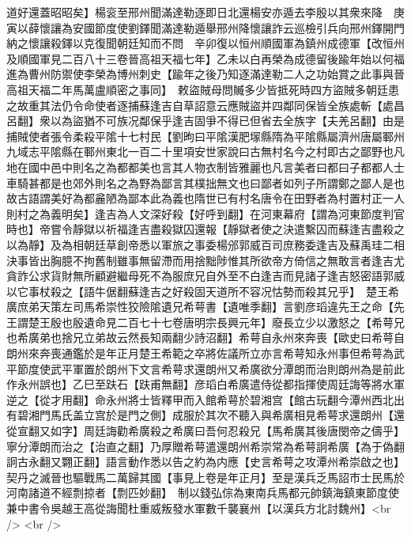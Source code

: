 道好還蓋昭昭矣】楊衮至邢州聞滿達勒逐即日北還楊安亦遁去李殷以其衆來降　庚寅以薛懷讓為安國節度使劉鐸聞滿達勒遁舉邢州降懷讓詐云巡檢引兵向邢州鐸開門納之懷讓殺鐸以克復聞朝廷知而不問　辛卯復以恒州順國軍為鎮州成德軍【改恒州及順國軍見二百八十三卷晉高祖天福七年】乙未以白再榮為成德留後踰年始以何福進為曹州防禦使李榮為博州刺史【踰年之後乃知逐滿達勒二人之功始賞之此事與晉高祖天福二年馬萬盧順密之事同】　敕盜賊母問贓多少皆抵死時四方盜賊多朝廷患之故重其法仍令命使者逐捕蘇逢吉自草詔意云應賊盜并四鄰同保皆全族處斬【處昌呂翻】衆以為盜猶不可族况鄰保乎逢吉固爭不得已但省去全族字【夫羌呂翻】由是捕賊使者張令柔殺平隂十七村民【劉昫曰平隂漢肥塜縣隋為平隂縣屬濟州唐屬鄆州九域志平隂縣在鄆州東北一百二十里項安世家說曰古無村名今之村即古之鄙野也凡地在國中邑中則名之為都都美也言其人物衣制皆雅麗也凡言美者曰都曰子都都人士車騎甚都是也郊外則名之為野為鄙言其樸拙無文也曰鄙者如列子所謂鄭之鄙人是也故古語謂美好為都麄陋為鄙本此為義也隋世已有村名唐令在田野者為村置村正一人則村之為義明矣】逢吉為人文深好殺【好呼到翻】在河東幕府【謂為河東節度判官時也】帝嘗令靜獄以祈福逢吉盡殺獄囚還報【靜獄者使之決遣繫囚而蘇逢吉盡殺之以為靜】及為相朝廷草創帝悉以軍旅之事委楊邠郭威百司庶務委逢吉及蘇禹珪二相決事皆出胸臆不拘舊制雖事無留滯而用捨黜陟惟其所欲帝方倚信之無敢言者逢吉尤貪詐公求貨財無所顧避繼母死不為服庶兄自外至不白逢吉而見諸子逢吉怒密語郭威以它事杖殺之【語牛倨翻蘇逢吉之好殺固天道所不容况怙勢而殺其兄乎】　楚王希廣庶弟天策左司馬希崇性狡險隂遺兄希萼書【遺唯季翻】言劉彦瑫違先王之命【先王謂楚王殷也殷遺命見二百七十七卷唐明宗長興元年】廢長立少以激怒之【希萼兄也希廣弟也捨兄立弟故云然長知兩翻少詩沼翻】希萼自永州來奔喪【歐史曰希萼自朗州來奔喪通鑑於是年正月楚王希範之卒將佐議所立亦言希萼知永州事但希萼為武平節度使武平軍置於朗州下文言希萼求還朗州又希廣欲分潭朗而治則朗州為是前此作永州誤也】乙巳至趺石【趺甫無翻】彦瑫白希廣遣侍從都指揮使周廷誨等將水軍逆之【從才用翻】命永州將士皆釋甲而入館希萼於碧湘宫【館古玩翻今潭州西北出有碧湘門馬氏盖立宫於是門之側】成服於其次不聽入與希廣相見希萼求還朗州【還從宣翻又如字】周廷誨勸希廣殺之希廣曰吾何忍殺兄【馬希廣其後唐閔帝之儔乎】寧分潭朗而治之【治直之翻】乃厚贈希萼遣還朗州希崇常為希萼詗希廣【為于偽翻詗古永翻又翾正翻】語言動作悉以告之約為内應【史言希萼之攻潭州希崇啟之也】　契丹之滅晉也驅戰馬二萬歸其國【事見上卷是年正月】至是漢兵乏馬詔市士民馬於河南諸道不經剽掠者【剽匹妙翻】　制以錢弘倧為東南兵馬都元帥鎮海鎮東節度使兼中書令吳越王高從誨聞杜重威叛發水軍數千襲襄州【以漢兵方北討魏州】<br />
<br />

